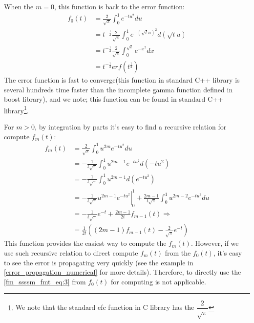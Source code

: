 When the $m=0$, this function is back to the error function:
\begin{equation}
\begin{split}
 f_{0}(t) &= \frac{2}{\sqrt{\pi}}\int^{1}_{0} e^{-tu^{2}} du  \\
          &= t^{-\frac{1}{2}}\frac{2}{\sqrt{\pi}}\int^{1}_{0} 
          e^{-(\sqrt{t}u)^{2}} d (\sqrt{t}u) \\
          &= t^{-\frac{1}{2}}\frac{2}{\sqrt{\pi}}\int^{\sqrt{t}}_{0} e^{-x^{2}} dx \\
          &= t^{-\frac{1}{2}} erf(t^{\frac{1}{2}})
\end{split}
\label{fm_ssssm_fmt_eq:2}
\end{equation}
The error function is fast to converge(this function in standard C++ library is several
hundreds time faster than the incomplete gamma function defined in boost library), and 
we note; this function can be found 
in standard C++ library\footnote{We note that the standard efc function in C library has 
the $\dfrac{2}{\sqrt{\pi}}$}.

For $m>0$, by integration by parts it's easy to find a recursive relation
for compute $f_{m}(t)$:
\begin{equation}
 \begin{split}
  f_{m}(t) &= \frac{2}{\sqrt{\pi}}\int^{1}_{0} u^{2m} e^{-tu^{2}} du \\ 
           &= -\frac{1}{t\sqrt{\pi}}\int^{1}_{0} u^{2m-1} e^{-tu^{2}} d(-tu^{2}) \\
           &= -\frac{1}{t\sqrt{\pi}}\int^{1}_{0} u^{2m-1} d\left( e^{-tu^{2}} \right) \\         
           &= -\left.\frac{1}{t\sqrt{\pi}}u^{2m-1} e^{-tu^{2}}\right|^{1}_{0} + 
           \frac{2m-1}{t\sqrt{\pi}}\int^{1}_{0} u^{2m-2} e^{-tu^{2}} du \\  
           &= -\frac{1}{t\sqrt{\pi}}e^{-t} + \frac{2m-1}{2t} f_{m-1}(t) \Rightarrow \\
           &= \frac{1}{2t}\left( (2m-1)f_{m-1}(t) - \frac{2}{\sqrt{\pi}}e^{-t}\right)    
 \end{split}
 \label{fm_ssssm_fmt_eq:3}
\end{equation}
This function provides the easiest way to compute the $f_{m}(t)$. However, if we use
such recursive relation to direct compute $f_{m}(t)$ from the $f_{0}(t)$, it's 
easy to see the error is propagating very quickly (see the example in 
\ref{error_propagation_numerical} for more details). Therefore, to directly use the 
\ref{fm_ssssm_fmt_eq:3} from $f_{0}(t)$ for computing is not applicable.

